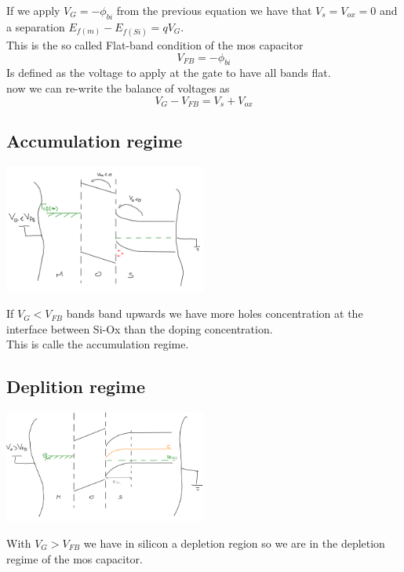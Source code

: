 If we apply $V_G=-\phi_{bi}$ from the previous equation we have that $V_s=V_{ox}=0$ and a separation $E_{f(m)}-E_{f(Si)}=qV_G$.\\
This is the so called Flat-band condition of the mos capacitor 
\begin{equation}
V_{FB}=-\phi_{bi}
\end{equation}
Is defined as the voltage to apply at the gate to have all bands flat.\\
now we can re-write the balance of voltages as
\begin{equation}
V_G-V_{FB}=V_s+V_{ox}
\end{equation}

\subsection{Accumulation regime}

\centering
\includegraphics[width=0.5\textwidth]{mos_accum.png}\\
\raggedright


If $V_G<V_{FB}$ bands band upwards we have more holes concentration at the interface between Si-Ox than the doping concentration. \\
This is calle the accumulation regime.

\subsection{Deplition regime} 

\centering
\includegraphics[width=0.5\textwidth]{mos_depl.png}\\
\raggedright

With $V_G>V_{FB}$ we have in silicon a depletion region so we are in the depletion regime of the mos capacitor.

